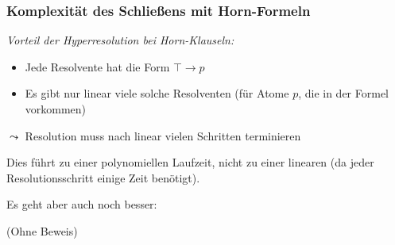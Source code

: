 \documentclass[aspectratio=1610,onlymath]{beamer}
\begin{document}
\begin{frame}\frametitle{Komplexität des Schließens mit Horn-Formeln}

\emph{Vorteil der Hyperresolution bei Horn-Klauseln:}
\begin{itemize}
\item Jede Resolvente hat die Form $\top\to p$
\item Es gibt nur linear viele solche Resolventen (für Atome $p$, die in der Formel vorkommen)
\end{itemize}
$\leadsto$ Resolution muss nach linear vielen Schritten terminieren
\pause\bigskip

Dies führt zu einer polynomiellen Laufzeit, nicht zu einer linearen (da jeder Resolutionsschritt einige Zeit benötigt).
\medskip

Es geht aber auch noch besser:


(Ohne Beweis)


\end{frame}
% 
% 
% 
% 



% 
% 
% 
% 

\end{document}
